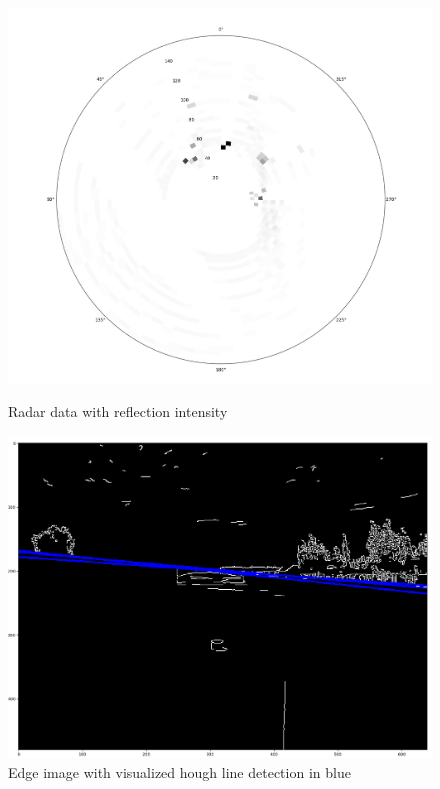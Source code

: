 \begin{figure}[!htb]
	\begin{minipage}[t]{0.48\textwidth}
		\centering
		\includegraphics[width=.9\linewidth]{Bilder/RadarIntensity.png}
		\caption{Radar data with reflection intensity}
		\label{fig_RadarIntense}
	\end{minipage}\hfill
	\begin{minipage}[t]{0.48\textwidth}
		\centering
		\includegraphics[width=.9\linewidth]{Bilder/houghlines.png}
		\caption{Edge image with visualized hough line detection in blue }
		\label{fig_Houghlines}
	\end{minipage}
\end{figure}

